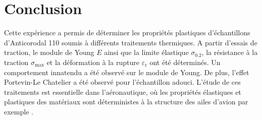 \section{Conclusion}

Cette expérience a permis de déterminer les propriétés plastiques d'échantillons d'Anticorodal 110 soumis à différents traitements thermiques. A partir d'essais de traction, le module de Young \(E\) ainsi que la limite élastique \(\sigma_{0.2}\), la résistance à la traction \(\sigma_{\textrm{max}}\) et la déformation à la rupture \(\varepsilon_{\textrm{r}}\) ont été déterminés. Un comportement innatendu a été observé sur le module de Young. De plus, l'effet Portevin-Le Chatelier a été observé pour l'échantillon adouci. L'étude de ces traitements est essentielle dans l'aéronautique, où les propriétés élastiques et plastiques des matériaux sont déterministes à la structure des ailes d'avion par exemple \cite{aluminium}.